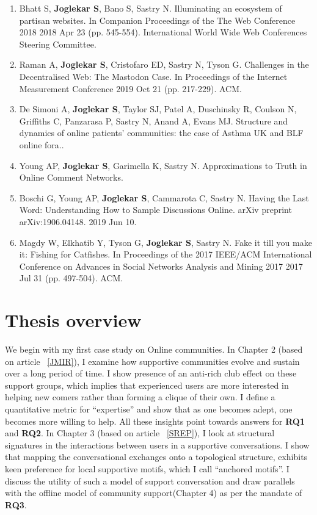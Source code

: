 \begin{enumerate}
    \item Bhatt S, \textbf{Joglekar S}, Bano S, Sastry N. Illuminating an ecosystem of partisan websites. In Companion Proceedings of the The Web Conference 2018 2018 Apr 23 (pp. 545-554). International World Wide Web Conferences Steering Committee.
    
    \item Raman A, \textbf{Joglekar S}, Cristofaro ED, Sastry N, Tyson G. Challenges in the Decentralised Web: The Mastodon Case. In Proceedings of the Internet Measurement Conference 2019 Oct 21 (pp. 217-229). ACM.
    
    \item De Simoni A, \textbf{Joglekar S}, Taylor SJ, Patel A, Duschinsky R, Coulson N, Griffiths C, Panzarasa P, Sastry N, Anand A, Evans MJ. Structure and dynamics of online patients’ communities: the case of Asthma UK and BLF online fora..
    
    \item Young AP, \textbf{Joglekar S}, Garimella K, Sastry N. Approximations to Truth in Online Comment Networks.
    
    \item Boschi G, Young AP, \textbf{Joglekar S}, Cammarota C, Sastry N. Having the Last Word: Understanding How to Sample Discussions Online. arXiv preprint arXiv:1906.04148. 2019 Jun 10.
    
    \item Magdy W, Elkhatib Y, Tyson G, \textbf{Joglekar S}, Sastry N. Fake it till you make it: Fishing for Catfishes. In Proceedings of the 2017 IEEE/ACM International Conference on Advances in Social Networks Analysis and Mining 2017 2017 Jul 31 (pp. 497-504). ACM.    
   
\end{enumerate}


\section{Thesis overview}
We begin with my first case study on Online communities.
In Chapter 2 (based on article ~\ref{JMIR}), I examine how supportive communities evolve and sustain over a long period of time. I show presence of an anti-rich club effect on these support groups, which implies that experienced users are more interested in helping new comers rather than forming a clique of their own. I define a quantitative metric for ``expertise'' and show that as one becomes adept, one becomes more willing to help. All these insights point towards answers for \textbf{RQ1} and \textbf{RQ2}. In Chapter 3 (based on article ~\ref{SREP}), I look at structural signatures in the interactions between users in a supportive conversations. I show that mapping the conversational exchanges onto a topological structure, exhibits keen preference for local supportive motifs, which I call ``anchored motifs''. I discuss the utility of such a model of support conversation and draw parallels with the offline model of community support(Chapter 4) as per the mandate of \textbf{RQ3}. 

